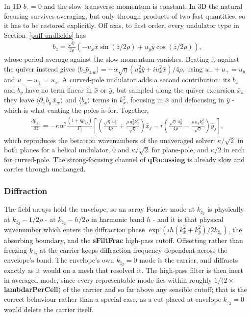 \documentclass[12pt]{article}%
\begin{document}
In 1D $b_z = 0$ and the slow transverse momentum is constant. In 3D the natural focusing survives averaging, but only through products of two fast quantities, so it has to be restored explicitly. Off axis, to first order, every undulator type in Section~\ref{puff-undfields} has
\begin{align}
b_z = \frac{\sqrt{\eta}}{2\rho}\left(-u_x \bar{x} \sin(\bar{z}/2\rho) + u_y \bar{y} \cos(\bar{z}/2\rho)\right),
\end{align}
whose period average against the slow momentum vanishes. Beating it against the quiver instead gives $\langle b_z \bar{p}_{\bot w}\rangle = -\alpha \sqrt{\eta} (u_y^2 \bar{y} + i u_x^2 \bar{x})/4\rho$, using $u_- + u_+ = u_y$ and $u_- - u_+ = u_x$. A curved-pole undulator adds a second contribution: its $b_x$ and $b_y$ have no term linear in $\bar{x}$ or $\bar{y}$, but sampled along the quiver excursion $\bar{x}_w$ they leave $\langle \partial_{\bar{x}} b_y\, \bar{x}_w \rangle$ and $\langle b_x \rangle$ terms in $k_x^2$, focusing in $\bar{x}$ and defocusing in $\bar{y}$ - which is what canting the poles is for. Together,
\begin{align}
\frac{d \bar{p}_{\bot j}}{d\bar{z}} = -\kappa \alpha^2 \frac{(1 + \eta p_{2j})}{\Gamma_j}
  \left[ \left( \frac{\sqrt{\eta}\, u_x^2}{4\rho} + \frac{\rho\, u_y^2 k_x^2}{\sqrt{\eta}} \right) \bar{x}_j
  - i \left( \frac{\sqrt{\eta}\, u_y^2}{4\rho} - \frac{\rho\, u_y k_x^2}{\sqrt{\eta}} \right) \bar{y}_j \right],
\end{align}
which reproduces the betatron wavenumbers of the unaveraged solver: $\kappa/\sqrt{2}$ in both planes for a helical undulator, $0$ and $\kappa/\sqrt{2}$ for plane-pole, and $\kappa/2$ in each for curved-pole. The strong-focusing channel of {\bf qFocussing} is already slow and carries through unchanged.

\subsubsection{Diffraction}

The field arrays hold the envelope, so an array Fourier mode at $k_{\bar{z}_2}$ is physically at $k_{\bar{z}_2} - 1/2\rho$ - at $k_{\bar{z}_2} - h/2\rho$ in harmonic band $h$ - and it is that physical wavenumber which enters the diffraction phase $\exp(i h (k_{\bar{x}}^2 + k_{\bar{y}}^2)/2k_{\bar{z}_2})$, the absorbing boundary, and the {\bf sFiltFrac} high-pass cutoff. Offsetting rather than freezing $k_{\bar{z}_2}$ at the carrier keeps diffraction frequency dependent across the envelope's band. The envelope's own $k_{\bar{z}_2} = 0$ mode is the carrier, and diffracts exactly as it would on a mesh that resolved it. The high-pass filter is then inert in averaged mode, since every representable mode lies within roughly $1/(2\times${\bf lambdarPerCell}$)$ of the carrier and so far above any sensible cutoff; that is the correct behaviour rather than a special case, as a cut placed at envelope $k_{\bar{z}_2} = 0$ would delete the carrier itself.
\end{document}
